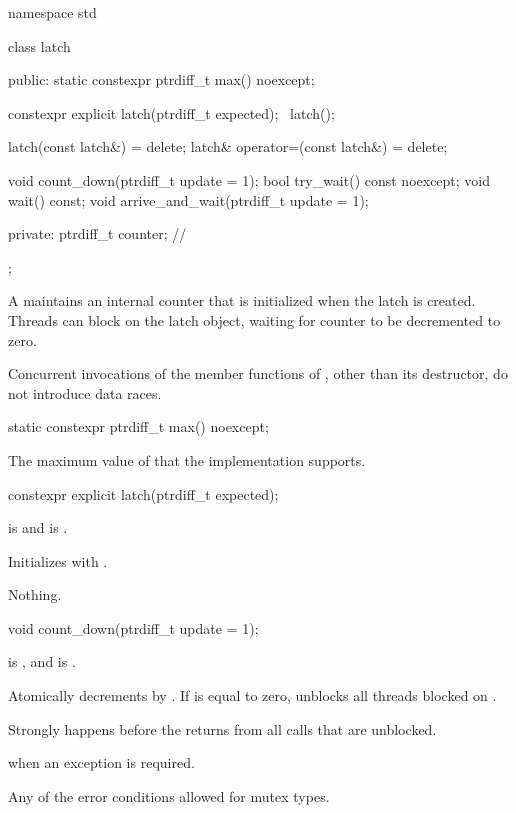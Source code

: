 \begin{codeblock}
namespace std {
  class latch {
  public:
    static constexpr ptrdiff_t max() noexcept;

    constexpr explicit latch(ptrdiff_t expected);
    ~latch();

    latch(const latch&) = delete;
    latch& operator=(const latch&) = delete;

    void count_down(ptrdiff_t update = 1);
    bool try_wait() const noexcept;
    void wait() const;
    void arrive_and_wait(ptrdiff_t update = 1);

  private:
    ptrdiff_t counter;  // \expos
  };
}
\end{codeblock}

\pnum
A  maintains an internal counter
that is initialized when the latch is created.
Threads can block on the latch object,
waiting for counter to be decremented to zero.

\pnum
Concurrent invocations of the member functions of ,
other than its destructor, do not introduce data races.

%
\begin{itemdecl}
static constexpr ptrdiff_t max() noexcept;
\end{itemdecl}

\begin{itemdescr}
\pnum
\returns
The maximum value of  that the implementation supports.
\end{itemdescr}

%
\begin{itemdecl}
constexpr explicit latch(ptrdiff_t expected);
\end{itemdecl}

\begin{itemdescr}
\pnum
\expects
{} is  and
 is .

\pnum
\effects
Initializes  with .

\pnum
\throws
Nothing.
\end{itemdescr}

%
\begin{itemdecl}
void count_down(ptrdiff_t update = 1);
\end{itemdecl}

\begin{itemdescr}
\pnum
\expects
{} is , and
 is .

\pnum
\effects
Atomically decrements  by .
If  is equal to zero,
unblocks all threads blocked on .

\pnum
\sync
Strongly happens before the returns from all calls that are unblocked.

\pnum
\throws
{} when an exception is required.

\pnum
\errors
Any of the error conditions
allowed for mutex types.
\end{itemdescr}

